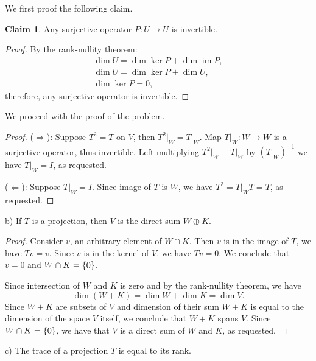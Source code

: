 \documentclass{article}
\theoremstyle{definition}
\newtheorem*{claim}{Claim}
\DeclareMathOperator{\im}{\operatorname{im}}
\DeclarePairedDelimiter\set{\{}{\}}
\newcommand{\restrict}[1]{ \big|_{#1} }
\begin{document}
We first proof the following claim.

\begin{claim}
Any surjective operator $P : U \to U$ is invertible.
\end{claim}

\begin{proof}
By the rank-nullity theorem:
\begin{gather*}
    \dim U = \dim \ker P + \dim \im P, \\
    \dim U = \dim \ker P + \dim U, \\
    \dim \ker P = 0,
\end{gather*}
therefore, any surjective operator is invertible.
\end{proof}

We proceed with the proof of the problem.

\begin{proof}
($\Longrightarrow$):
Suppose $T^2 = T$ on $V$, then $T^2\restrict{W} = T\restrict{W}$.
Map $T\restrict{W}: W \to W$ is a surjective operator, thus invertible.
Left multiplying $T^2\restrict{W} = T\restrict{W}$ by $\left(T\restrict{W}\right)^{-1}$ we have $T\restrict{W} = I$, as requested.

($\Longleftarrow$):
Suppose $T \restrict{W} = I$.
Since image of $T$ is $W$, we have $T^2 = T\restrict{W}T = T$, as requested.

\end{proof}

\begin{tcolorbox}
b) If $T$ is a projection, then $V$ is the direct sum $W \oplus K$.
\end{tcolorbox}

\begin{proof}

Consider $v$, an arbitrary element of $W \cap K$.
Then $v$ is in the image of $T$, we have $Tv = v$.
Since $v$ is in the kernel of $V$, we have $Tv = 0$.
We conclude that $v = 0$ and $W \cap K = \set{0}$.

Since intersection of $W$ and $K$ is zero and by the rank-nullity theorem, we have
\[ \dim (W+K) = \dim W + \dim K = \dim V. \]
Since $W+K$ are subsets of $V$ and dimension of their sum $W+K$ is equal to the dimension of the space $V$ itself, we conclude that $W+K$ spans $V$.
Since $W \cap K = \set{0}$, we have that $V$ is a direct sum of $W$ and $K$, as requested.

\end{proof}

\begin{tcolorbox}
c) The trace of a projection $T$ is equal to its rank.
\end{tcolorbox}
\end{document}
